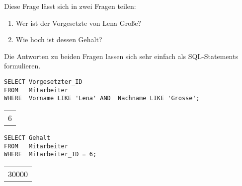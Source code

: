 Diese Frage lässt sich in zwei Fragen teilen:
\begin{enumerate}
    \item Wer ist der Vorgesetzte von Lena Große?
    \item Wie hoch ist dessen Gehalt?
\end{enumerate}
Die Antworten zu beiden Fragen lassen sich sehr einfach als SQL-Statements formulieren.
\begin{lstlisting}[language=oracle_sql,caption={Wer ist der Vorgesetzte von Lena Grosse},label=sql06_01]
SELECT Vorgesetzter_ID
FROM   Mitarbeiter
WHERE  Vorname LIKE 'Lena' AND  Nachname LIKE 'Grosse';
        \end{lstlisting}
\begin{center}
    \begin{small}
        \tablehead{}
        \begin{msoraclesql}
            \begin{supertabular}{r}
                6 \\
            \end{supertabular}
        \end{msoraclesql}
    \end{small}
\end{center}
\begin{lstlisting}[language=oracle_sql,caption={Wie hoch ist dessen Gehalt},label=sql06_02]
SELECT Gehalt
FROM   Mitarbeiter
WHERE  Mitarbeiter_ID = 6;
        \end{lstlisting}
\begin{center}
    \begin{small}
        \tablehead{}
        \begin{msoraclesql}
            \begin{supertabular}{r}
                30000 \\
            \end{supertabular}
        \end{msoraclesql}
    \end{small}
\end{center}
